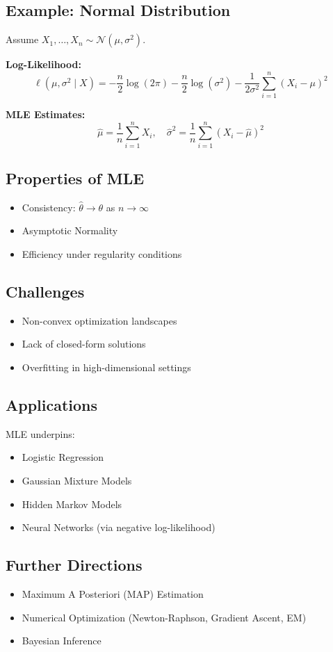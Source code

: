 \documentclass[10pt,a4paper]{article}
\begin{document}
\subsection{Example: Normal Distribution}

Assume $X_1, \ldots, X_n \sim \mathcal{N}(\mu, \sigma^2)$.

\textbf{Log-Likelihood:}
\[
\ell(\mu, \sigma^2 \mid X) =
-\frac{n}{2}\log(2\pi)
-\frac{n}{2}\log(\sigma^2)
-\frac{1}{2\sigma^2} \sum_{i=1}^{n}(X_i - \mu)^2
\]

\textbf{MLE Estimates:}
\[
\hat{\mu} = \frac{1}{n}\sum_{i=1}^{n} X_i, \quad
\hat{\sigma}^2 = \frac{1}{n}\sum_{i=1}^{n}(X_i - \hat{\mu})^2
\]


\subsection{Properties of MLE}
\begin{itemize}
    \item Consistency: $\hat{\theta} \to \theta$ as $n \to \infty$
    \item Asymptotic Normality
    \item Efficiency under regularity conditions
\end{itemize}


\subsection{Challenges}
\begin{itemize}
    \item Non-convex optimization landscapes
    \item Lack of closed-form solutions
    \item Overfitting in high-dimensional settings
\end{itemize}


\subsection{Applications}
MLE underpins:
\begin{itemize}
    \item Logistic Regression
    \item Gaussian Mixture Models
    \item Hidden Markov Models
    \item Neural Networks (via negative log-likelihood)
\end{itemize}


\subsection{Further Directions}
\begin{itemize}
    \item Maximum A Posteriori (MAP) Estimation
    \item Numerical Optimization (Newton-Raphson, Gradient Ascent, EM)
    \item Bayesian Inference
\end{itemize}
\end{document}
